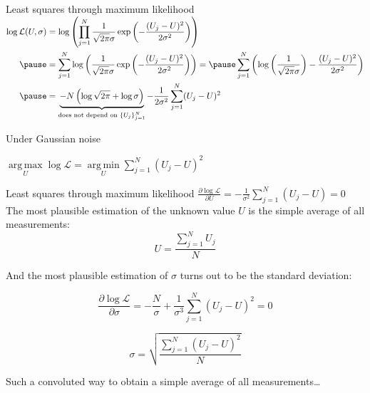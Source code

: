 \documentclass[UKenglish,aspectratio=169]{beamer}
\DeclareMathOperator*{\argmin}{arg\,min}
\DeclareMathOperator*{\argmax}{arg\,max}
\begin{document}
\begin{frame}{Least squares through maximum likelihood}
$
\begin{aligned}
\log \mathcal{L}(U,\sigma) & = \log \left(\prod\limits_{j=1}^N  \frac{1}{\sqrt{2\pi}\sigma} \exp\left(-\frac{(U_j-U)^2}{2\sigma^2}\right)\right) \\ \pause
& = \sum\limits_{j=1}^N \log \left(\frac{1}{\sqrt{2\pi}\sigma} \exp\left(-\frac{(U_j-U)^2}{2\sigma^2}\right)\right) =  \pause
  \sum\limits_{j=1}^N \left(\log \left(\frac{1}{\sqrt{2\pi}\sigma}\right) -\frac{(U_j-U)^2}{2\sigma^2}\right)  \\ \pause
& = \underbrace{-N \left(\log\sqrt{2\pi} + \log\sigma\right)}_{\text{does not depend on } \{U_j\}_{j=1}^{N}} - \frac{1}{2\sigma^2} \sum\limits_{j=1}^N (U_j-U)^2
\end{aligned}
$

\begin{block}{Under Gaussian noise}
\centerline{$
\argmax\limits_{U} \log \mathcal{L} = \argmin\limits_U \sum\limits_{j=1}^N (U_j-U)^2
$}
\end{block}
\end{frame}

\begin{frame}{Least squares through maximum likelihood}
$
\frac{\partial\log\mathcal{L}}{\partial U}    = - \frac{1}{\sigma^2}\sum\limits_{j=1}^N (U_j-U) = 0 
$\\ \pause
The most plausible estimation of the unknown value $U$ is the simple average of all measurements:
$$
U = \frac{\sum\limits_{j=1}^N U_j}{N}
$$

\pause And the most plausible estimation of $\sigma$ turns out to be the standard deviation:
\begin{minipage}{.45\linewidth}
$$
\frac{\partial\log\mathcal{L}}{\partial\sigma} =  -\frac{N}{\sigma} + \frac{1}{\sigma^3}\sum\limits_{j=1}^N (U_j-U)^2 = 0
$$
\end{minipage} \pause
\begin{minipage}{.45\linewidth}
$$
\sigma = \sqrt{\frac{\sum\limits_{j=1}^N (U_j-U)^2}{N}}
$$
\end{minipage}

\vspace{15pt}
Such a convoluted way to obtain a simple average of all measurements\dots
\end{frame}
\end{document}
